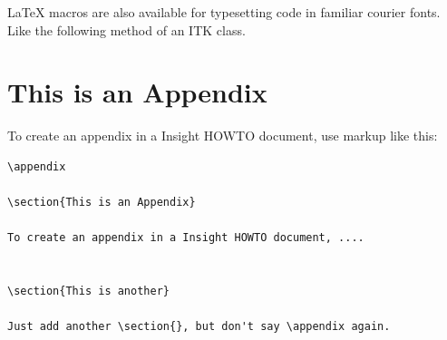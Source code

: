 \documentclass{InsightArticle}
\begin{document}

LaTeX macros are also available for typesetting code in familiar courier fonts.
Like the following method of an ITK class.







\appendix

\section{This is an Appendix}

To create an appendix in a Insight HOWTO document, use markup like
this:

\begin{verbatim}
\appendix

\section{This is an Appendix}

To create an appendix in a Insight HOWTO document, ....


\section{This is another}

Just add another \section{}, but don't say \appendix again.
\end{verbatim}


%
%
\end{document}
